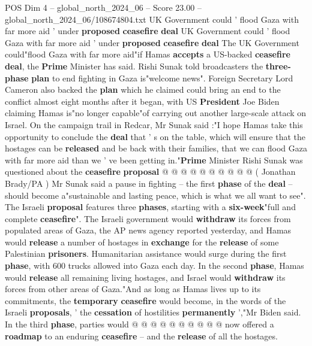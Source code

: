 \begin{textsample}{POS Dim 4 – global\_north\_2024\_06 – Score 23.00 – global\_north\_2024\_06/108674804.txt}  \label{ex:f4_pos_149}
UK Government could ' flood Gaza with far more aid ' under \textbf{proposed} \textbf{ceasefire} \textbf{deal} UK Government could ' flood Gaza with far more aid ' under \textbf{proposed} \textbf{ceasefire} \textbf{deal} The UK Government could"flood Gaza with far more aid"if Hamas \textbf{accepts} a US-backed \textbf{ceasefire} \textbf{deal}, the \textbf{Prime} Minister has said.
Rishi Sunak told broadcasters the \textbf{three-phase} \textbf{plan} to end fighting in Gaza is"welcome news".
Foreign Secretary Lord Cameron also backed the \textbf{plan} which he claimed could bring an end to the conflict almost eight months after it began, with US \textbf{President} Joe Biden claiming Hamas is"no longer capable"of carrying out another large-scale attack on Israel.
On the campaign trail in Redcar, Mr Sunak said :"I hope Hamas take this opportunity to conclude the \textbf{deal} that ' s on the table, which will ensure that the hostages can be \textbf{released} and be back with their families, that we can flood Gaza with far more aid than we ' ve been getting in."\textbf{Prime} Minister Rishi Sunak was questioned about the \textbf{ceasefire} \textbf{proposal} @ @ @ @ @ @ @ @ @ @ ( Jonathan Brady/PA ) Mr Sunak said a pause in fighting -- the first \textbf{phase} of the \textbf{deal} -- should become a"sustainable and lasting peace, which is what we all want to see".
The Israeli \textbf{proposal} features three \textbf{phases}, starting with a \textbf{six-week}"full and complete \textbf{ceasefire}".
The Israeli government would \textbf{withdraw} its forces from populated areas of Gaza, the AP news agency reported yesterday, and Hamas would \textbf{release} a number of hostages in \textbf{exchange} for the \textbf{release} of some Palestinian \textbf{prisoners}.
Humanitarian assistance would surge during the first \textbf{phase}, with 600 trucks allowed into Gaza each day.
In the second \textbf{phase}, Hamas would \textbf{release} all remaining living hostages, and Israel would \textbf{withdraw} its forces from other areas of Gaza."And as long as Hamas lives up to its commitments, the \textbf{temporary} \textbf{ceasefire} would become, in the words of the Israeli \textbf{proposals}, ' the \textbf{cessation} of hostilities \textbf{permanently} ',"Mr Biden said.
In the third \textbf{phase}, parties would @ @ @ @ @ @ @ @ @ @ now offered a \textbf{roadmap} to an enduring \textbf{ceasefire} -- and the \textbf{release} of all the hostages.

\end{textsample}

